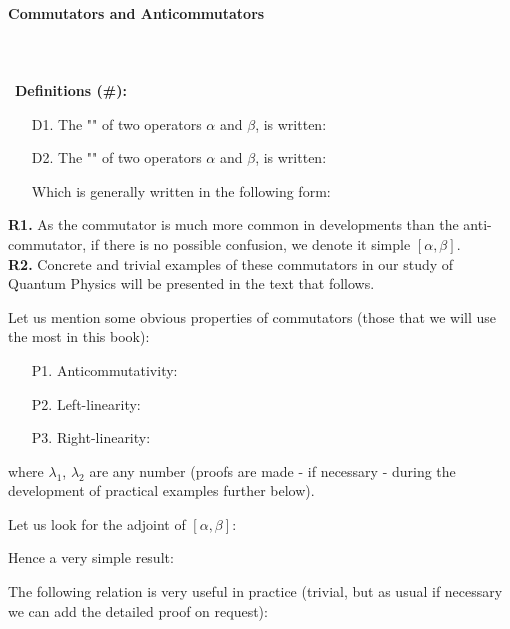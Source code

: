 	\pagebreak
	\paragraph{Commutators and Anticommutators}\label{commutators and anticommutators}\mbox{}\\\\\
	\textbf{Definitions (\#\mydef):}
	\begin{itemize}
		\item[D1.] The "" of two operators $\alpha$ and $\beta$, is written:
		
		\item[D2.] The "" of two operators $\alpha$ and $\beta$, is written:
		
		Which is generally written in the following form:
		
	\end{itemize}
	\begin{tcolorbox}[title=Remarks,colframe=black,arc=10pt]
	\textbf{R1.} As the commutator is much more common in developments than the anti-commutator, if there is no possible confusion, we denote it simple $[\alpha,\beta]$.\\
	
	\textbf{R2.} Concrete and trivial examples of these commutators in our study of Quantum Physics will be presented in the text that follows.
	\end{tcolorbox}
	Let us mention some obvious properties of commutators (those that we will use the most in this book):
	\begin{enumerate}
		\item[P1.] Anticommutativity:
		

		\item[P2.] Left-linearity:
		

		\item[P3.] Right-linearity:
		
	\end{enumerate}
	where $\lambda_1$, $\lambda_2$ are any number (proofs are made - if necessary - during the development of practical examples further below).
	
	Let us look for the adjoint of $[\alpha,\beta]$:
	
	Hence a very simple result:
	
	The following relation is very useful in practice (trivial, but as usual if necessary we can add the detailed proof on request):
	
